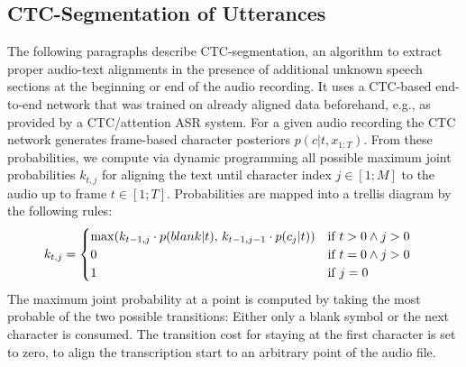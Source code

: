 \documentclass[runningheads]{llncs}
\begin{document}
\subsection{CTC-Segmentation of Utterances}
\label{sec:alignment}
The following paragraphs describe CTC-segmentation, an algorithm to extract proper audio-text alignments in the presence of additional unknown speech sections at the beginning or end of the audio recording.
It uses a CTC-based end-to-end network that was trained on already aligned data beforehand, e.g., as provided by a CTC/attention ASR system.
For a given audio recording the CTC network generates frame-based character posteriors $p(c | t, x_{1:T})$.
From these probabilities, we compute via dynamic programming all possible maximum joint probabilities $k_{t,j}$ for aligning the text until character index $j\in [1;M]$ to the audio up to frame $t\in [1;T]$.
Probabilities are mapped into a trellis diagram by the following rules:
\begin{align}
k_{t,j} &= 
\begin{cases}
\max(k_{t - 1,j} \cdot p( blank | t), \, k_{t - 1,j - 1} \cdot p(c_j | t)) & \raisebox{0pt}{$\text{if } t > 0 \wedge j > 0$} \\
0 & \text{if } t = 0 \wedge j > 0 \\
1 & \text{if } j = 0 
\end{cases}
\end{align}
The maximum joint probability at a point is computed by taking the most probable of the two possible transitions:
Either only a blank symbol or the next character is consumed.
The transition cost for staying at the first character is set to zero, to align the transcription start to an arbitrary point of the audio file.
\end{document}
